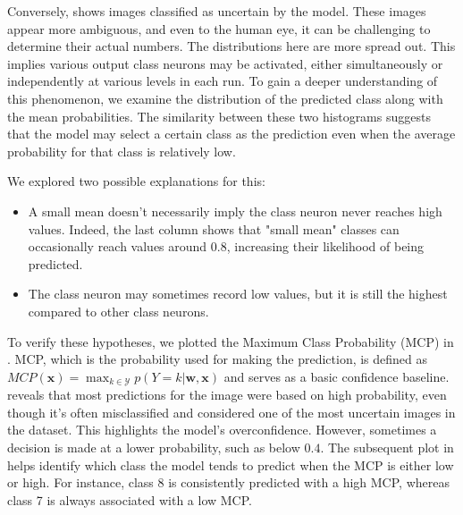 Conversely,  shows images classified as uncertain by the model. These images appear more ambiguous, and even to the human eye, it can be challenging to determine their actual numbers. The distributions here are more spread out. This implies various output class neurons may be activated, either simultaneously or independently at various levels in each run. To gain a deeper understanding of this phenomenon, we examine the distribution of the predicted class along with the mean probabilities. The similarity between these two histograms suggests that the model may select a certain class as the prediction even when the average probability for that class is relatively low.

We explored two possible explanations for this:
\begin{itemize}
    \item A small mean doesn't necessarily imply the class neuron never reaches high values. Indeed, the last column shows that "small mean" classes can occasionally reach values around $0.8$, increasing their likelihood of being predicted.
    \item The class neuron may sometimes record low values, but it is still the highest compared to other class neurons.
\end{itemize}
To verify these hypotheses, we plotted the Maximum Class Probability (MCP) in . MCP, which is the probability used for making the prediction, is defined as $ MCP(\boldsymbol{x}) = \max _{k \in \mathcal{Y}} p(Y=k | \boldsymbol{w}, \boldsymbol{x}) $ and serves as a basic confidence baseline.  reveals that most predictions for the image were based on high probability, even though it's often misclassified and considered one of the most uncertain images in the dataset. This highlights the model's overconfidence. However, sometimes a decision is made at a lower probability, such as below $ 0.4 $. The subsequent plot in  helps identify which class the model tends to predict when the MCP is either low or high. For instance, class 8 is consistently predicted with a high MCP, whereas class 7 is always associated with a low MCP.

